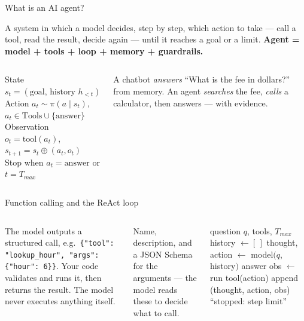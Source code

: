 \documentclass[aspectratio=169,11pt]{beamer}
\begin{document}

\begin{frame}{What is an AI agent?}
\begin{bdef}[Agent]
A system in which a model decides, step by step, which action to take --- call a tool, read the result, decide again --- until it reaches a goal or a limit. \textbf{Agent = model + tools + loop + memory + guardrails.}
\end{bdef}
\begin{columns}[T]
\begin{bmath}
State $s_t=(\text{goal},\,\text{history }h_{<t})$\\
Action $a_t\sim\pi(a\mid s_t)$, \; $a_t\in\text{Tools}\cup\{\text{answer}\}$\\
Observation $o_t=\text{tool}(a_t)$, \; $s_{t+1}=s_t\oplus(a_t,o_t)$\\
Stop when $a_t=\text{answer}$ or $t=T_{max}$
\end{bmath}
\begin{bex}
A chatbot \emph{answers} ``What is the fee in dollars?'' from memory. An agent \emph{searches} the fee, \emph{calls} a calculator, then answers --- with evidence.
\end{bex}
\end{columns}
\end{frame}

\begin{frame}{Function calling and the ReAct loop}
\begin{columns}[T]
\begin{bdef}
The model outputs a structured call, e.g.\ \texttt{\{"tool": "lookup\_hour", "args": \{"hour": 6\}\}}. Your code validates and runs it, then returns the result. The model never executes anything itself.
\end{bdef}
\begin{bdef}
Name, description, and a JSON Schema for the arguments --- the model reads these to decide what to call.
\end{bdef}
\begin{balgo}[ReAct]
\begin{algorithmic}[1]
\Require question $q$, tools, $T_{max}$
\State history $\gets[\,]$
  \State thought, action $\gets$ model$(q$, history$)$
   \State \Return answer \EndIf
  \State obs $\gets$ run tool(action)
  \State append (thought, action, obs)
\EndFor
\State \Return ``stopped: step limit''
\end{algorithmic}
\end{balgo}
\end{columns}
\end{frame}
\end{document}
